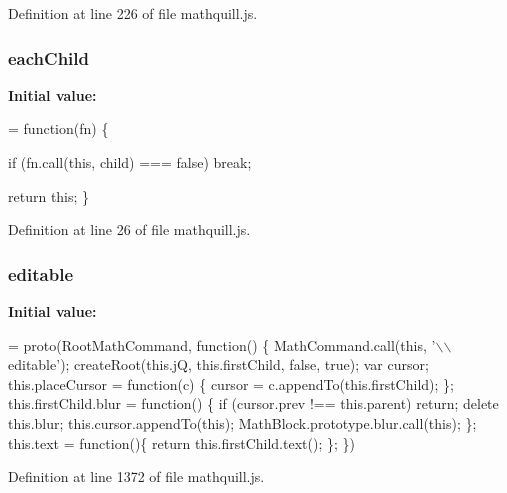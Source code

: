Definition at line 226 of file mathquill.\-js.

\subsubsection[{each\-Child}]{\setlength{\rightskip}{0pt plus 5cm}{\bf \-\_\-} each\-Child}\label{mathquill_8js_a0c9878fe90ea8debb17cb894b6ac61e3}
{\bfseries Initial value\-:}
\begin{DoxyCode}
= \textcolor{keyword}{function}(fn) \{

    \textcolor{keywordflow}{if} (fn.call(\textcolor{keyword}{this}, child) === \textcolor{keyword}{false}) \textcolor{keywordflow}{break};

  \textcolor{keywordflow}{return} \textcolor{keyword}{this};
\}
\end{DoxyCode}


Definition at line 26 of file mathquill.\-js.

\subsubsection[{editable}]{ editable}\label{mathquill_8js_afd42217a15c6a580b08f1e57f5708e83}
{\bfseries Initial value\-:}
\begin{DoxyCode}
= proto(RootMathCommand, \textcolor{keyword}{function}() \{
  MathCommand.call(\textcolor{keyword}{this}, \textcolor{stringliteral}{'\(\backslash\)\(\backslash\)editable'});
  createRoot(this.jQ, this.firstChild, \textcolor{keyword}{false}, \textcolor{keyword}{true});
  var cursor;
  this.placeCursor = \textcolor{keyword}{function}(c) \{ cursor = c.appendTo(this.firstChild); \};
  this.firstChild.blur = \textcolor{keyword}{function}() \{
    \textcolor{keywordflow}{if} (cursor.prev !== \textcolor{keyword}{this}.parent) \textcolor{keywordflow}{return}; 
    \textcolor{keyword}{delete} this.blur;
    this.cursor.appendTo(\textcolor{keyword}{this});
    MathBlock.prototype.blur.call(\textcolor{keyword}{this});
  \};
  this.text = \textcolor{keyword}{function}()\{ \textcolor{keywordflow}{return} this.firstChild.text(); \};
\})
\end{DoxyCode}


Definition at line 1372 of file mathquill.\-js.

